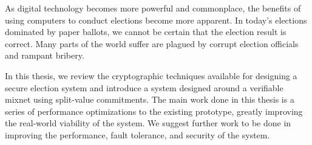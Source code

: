 %
%
%

As digital technology becomes more powerful and commonplace, the benefits of using computers to conduct elections become more apparent. In today's elections dominated by paper ballots, we cannot be certain that the election result is correct. Many parts of the world suffer are plagued by corrupt election officials and rampant bribery.

In this thesis, we review the cryptographic techniques available for designing a secure election system and introduce a system designed around a verifiable mixnet using split-value commitments. The main work done in this thesis is a series of performance optimizations to the existing prototype, greatly improving the real-world viability of the system. We suggest further work to be done in improving the performance, fault tolerance, and security of the system.
